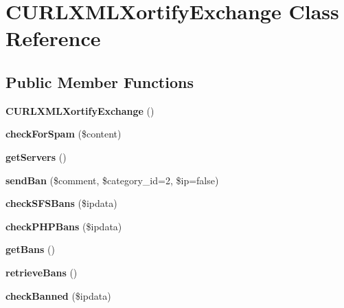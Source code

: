 \hypertarget{class_c_u_r_l_x_m_l_xortify_exchange}{\section{C\-U\-R\-L\-X\-M\-L\-Xortify\-Exchange Class Reference}
\label{class_c_u_r_l_x_m_l_xortify_exchange}
}
\subsection*{Public Member Functions}
\begin{DoxyCompactItemize}
\item 
\hypertarget{class_c_u_r_l_x_m_l_xortify_exchange_a3b76009f81aba09d4775db8b93c36fe3}{{\bfseries C\-U\-R\-L\-X\-M\-L\-Xortify\-Exchange} ()}\label{class_c_u_r_l_x_m_l_xortify_exchange_a3b76009f81aba09d4775db8b93c36fe3}

\item 
\hypertarget{class_c_u_r_l_x_m_l_xortify_exchange_a7a4f53c3841dc7806455261af557d514}{{\bfseries check\-For\-Spam} (\$content)}\label{class_c_u_r_l_x_m_l_xortify_exchange_a7a4f53c3841dc7806455261af557d514}

\item 
\hypertarget{class_c_u_r_l_x_m_l_xortify_exchange_a882f365bc81e207dc2123ef707735e82}{{\bfseries get\-Servers} ()}\label{class_c_u_r_l_x_m_l_xortify_exchange_a882f365bc81e207dc2123ef707735e82}

\item 
\hypertarget{class_c_u_r_l_x_m_l_xortify_exchange_a0293acfa4afe0cb5b2816352a35d8ca7}{{\bfseries send\-Ban} (\$comment, \$category\-\_\-id=2, \$ip=false)}\label{class_c_u_r_l_x_m_l_xortify_exchange_a0293acfa4afe0cb5b2816352a35d8ca7}

\item 
\hypertarget{class_c_u_r_l_x_m_l_xortify_exchange_a985a563a84e3e5c54694fcce192bda53}{{\bfseries check\-S\-F\-S\-Bans} (\$ipdata)}\label{class_c_u_r_l_x_m_l_xortify_exchange_a985a563a84e3e5c54694fcce192bda53}

\item 
\hypertarget{class_c_u_r_l_x_m_l_xortify_exchange_aeb1bf9aaee4718870adbd07333490aaf}{{\bfseries check\-P\-H\-P\-Bans} (\$ipdata)}\label{class_c_u_r_l_x_m_l_xortify_exchange_aeb1bf9aaee4718870adbd07333490aaf}

\item 
\hypertarget{class_c_u_r_l_x_m_l_xortify_exchange_aea26db2906896833d32445a698fc4cdc}{{\bfseries get\-Bans} ()}\label{class_c_u_r_l_x_m_l_xortify_exchange_aea26db2906896833d32445a698fc4cdc}

\item 
\hypertarget{class_c_u_r_l_x_m_l_xortify_exchange_a4af29af927aae9aada97ef0c2cd08fa1}{{\bfseries retrieve\-Bans} ()}\label{class_c_u_r_l_x_m_l_xortify_exchange_a4af29af927aae9aada97ef0c2cd08fa1}

\item 
\hypertarget{class_c_u_r_l_x_m_l_xortify_exchange_ae41df0f26620b727f7f63342648f6474}{{\bfseries check\-Banned} (\$ipdata)}\label{class_c_u_r_l_x_m_l_xortify_exchange_ae41df0f26620b727f7f63342648f6474}

\end{DoxyCompactItemize}
